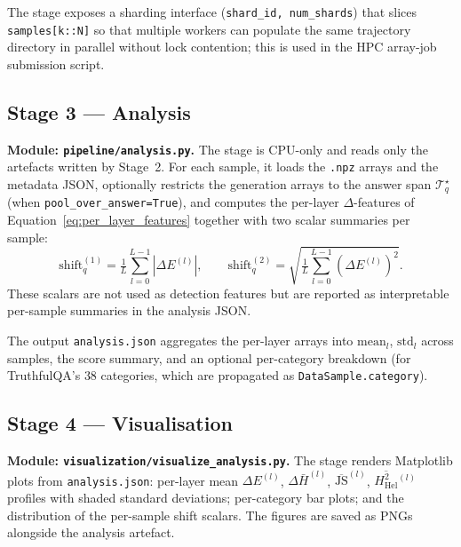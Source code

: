 The stage exposes a sharding interface
(\texttt{shard\_id, num\_shards}) that slices \texttt{samples[k::N]} so
that multiple workers can populate the same trajectory directory in
parallel without lock contention; this is used in the HPC array-job
submission script.

\subsection{Stage 3 — Analysis}
\label{subsec:stage3}

\textbf{Module: \texttt{pipeline/analysis.py}.} The stage is CPU-only and
reads only the artefacts written by Stage~2. For each sample, it loads the
\texttt{.npz} arrays and the metadata JSON, optionally restricts the
generation arrays to the answer span $\mathcal{T}_q^\star$ (when
\texttt{pool\_over\_answer=True}), and computes the per-layer
$\Delta$-features of Equation~\eqref{eq:per_layer_features} together with
two scalar summaries per sample:
\begin{equation}
    \mathrm{shift}^{(1)}_q
    =
    \tfrac{1}{L}\sum_{l=0}^{L-1}\!\!\left|\Delta E^{(l)}\right|,
    \qquad
    \mathrm{shift}^{(2)}_q
    =
    \!\sqrt{\tfrac{1}{L}\sum_{l=0}^{L-1}\!\!\left(\Delta E^{(l)}\right)^{\!2}}.
    \label{eq:shift_scalars}
\end{equation}
These scalars are not used as detection features but are reported as
interpretable per-sample summaries in the analysis JSON.

The output \texttt{analysis.json} aggregates the per-layer arrays into
$\mathrm{mean}_l$, $\mathrm{std}_l$ across samples, the score summary,
and an optional per-category breakdown (for TruthfulQA's $38$ categories,
which are propagated as \texttt{DataSample.category}).

\subsection{Stage 4 — Visualisation}
\label{subsec:stage4}

\textbf{Module: \texttt{visualization/visualize\_analysis.py}.} The stage
renders Matplotlib plots from \texttt{analysis.json}: per-layer mean
$\Delta E^{(l)}$, $\Delta \bar{H}^{(l)}$,
$\overline{\mathrm{JS}}^{(l)}$, $\overline{H^2_{\mathrm{Hel}}}{}^{(l)}$
profiles with shaded standard deviations; per-category bar plots; and
the distribution of the per-sample shift scalars. The figures are saved
as PNGs alongside the analysis artefact.

